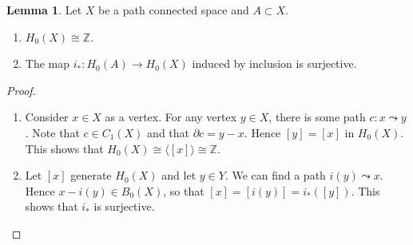 \documentclass[10pt,letterpaper,cm]{nupset}
\theoremstyle{definition}
\theoremstyle{theorem}
\newtheorem{lemma}[definition]{Lemma}
\theoremstyle{remark}
\newcommand{\Z}{\mathbb Z}
\newcommand{\1}{\mathbb{1}}
\newcommand{\0}{\vec 0}
\begin{document}
\begin{lemma}\label{l21} Let $X$ be a path connected space and $A\subset X$.
\begin{enumerate}
\item $H_0(X) \cong \Z$.
\item The map $i_{\ast}: H_0(A) \to H_0(X)$ induced by inclusion is surjective. 
\end{enumerate}
\end{lemma}
\begin{proof} $ $
\begin{enumerate} 
\item Consider $x\in X$ as a vertex. For any vertex $y\in X$, there is some path $c: x\leadsto y$. Note that $c \in C_1(X)$ and that $\partial{c}= y-x$. Hence $[y]= [x]$ in $H_0(X)$. This shows that $H_0(X) \cong \langle [x] \rangle \cong \Z$.
\item Let $[x]$ generate $H_0(X)$ and let $y\in Y$. We can find a path $i(y) \leadsto x$. Hence $x-i(y)\in B_0(X)$, so that $[x] =[i(y)]= i_{\ast}([y])$. This shows that $i_{\ast}$ is surjective.
\end{enumerate}
\end{proof}
\end{document}
